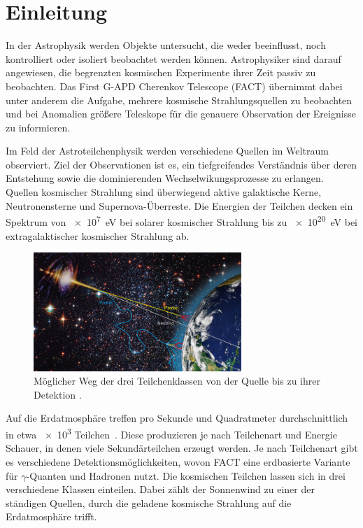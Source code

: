 \chapter{Einleitung}
In der Astrophysik werden Objekte untersucht, die weder beeinflusst, noch kontrolliert oder isoliert beobachtet werden können.
Astrophysiker sind darauf angewiesen, die begrenzten kosmischen Experimente ihrer Zeit passiv zu beobachten. 
Das First G-APD Cherenkov Telescope (FACT) übernimmt dabei unter anderem die Aufgabe, mehrere kosmische Strahlungsquellen zu beobachten und bei Anomalien größere Teleskope für die genauere Observation der Ereignisse zu informieren. 

Im Feld der Astroteilchenphysik werden verschiedene Quellen im Weltraum observiert.
Ziel der Observationen ist es, ein tiefgreifendes Verständnis über deren Entstehung sowie die dominierenden Wechselwikungsprozesse zu erlangen. 
Quellen kosmischer Strahlung sind überwiegend aktive galaktische Kerne, Neutronensterne und Supernova-Überreste. 
Die Energien der Teilchen decken ein Spektrum von \SI{e7}{\electronvolt} bei solarer kosmischer Strahlung bis zu \SI{e20}{\electronvolt} bei extragalaktischer kosmischer Strahlung ab. 

\begin{figure}
  \centering
  \includegraphics[width=0.7\textwidth]{./images/sources-detection.jpg}
  \caption{Möglicher Weg der drei Teilchenklassen von der Quelle bis zu ihrer Detektion \cite{overview-detec}.}
\end{figure}

Auf die Erdatmosphäre treffen pro Sekunde und Quadratmeter durchschnittlich in etwa \num{e3} Teilchen~\cite{gaisser}.
Diese produzieren je nach Teilchenart und Energie Schauer, in denen viele Sekundärteilchen erzeugt werden. 
Je nach Teilchenart gibt es verschiedene Detektionsmöglichkeiten, wovon FACT eine erdbasierte Variante für $\gamma$-Quanten und Hadronen nutzt. 
Die kosmischen Teilchen lassen sich in drei verschiedene Klassen einteilen. 
Dabei zählt der Sonnenwind zu einer der ständigen Quellen, durch die geladene kosmische Strahlung auf die Erdatmosphäre trifft.

